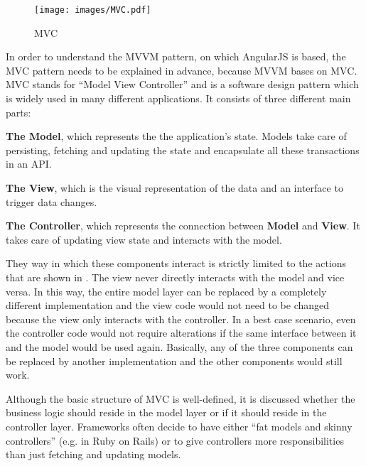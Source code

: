 \begin{figure}[htb]
  \centerline{\texttt{[image: images/MVC.pdf]}}
  \caption[MVC]{MVC}
  \label{fig:mvc}
\end{figure}

In order to understand the MVVM pattern, on which AngularJS is based, the MVC pattern needs to be explained in advance, because MVVM bases on MVC. MVC stands for ``Model View Controller'' and is a software design pattern which is widely used in many different applications. It consists of three different main parts:

\textbf{The Model}, which represents the the application's state. Models take care of persisting, fetching and updating the state and encapsulate all these transactions in an API.

\textbf{The View}, which is the visual representation of the data and an interface to trigger data changes.

\textbf{The Controller}, which represents the connection between \textbf{Model} and \textbf{View}. It takes care of updating view state and interacts with the model.

They way in which these components interact is strictly limited to the actions that are shown in . The view never directly interacts with the model and vice versa. In this way, the entire model layer can be replaced by a completely different implementation and the view code would not need to be changed because the view only interacts with the controller. In a best case scenario, even the controller code would not require alterations if the same interface between it and the model would be used again. Basically, any of the three components can be replaced by another implementation and the other components would still work.

Although the basic structure of MVC is well-defined, it is discussed whether the business logic should reside in the model layer or if it should reside in the controller layer. Frameworks often decide to have either ``fat models and skinny controllers'' (e.g. in Ruby on Rails) or to give controllers more responsibilities than just fetching and updating models.